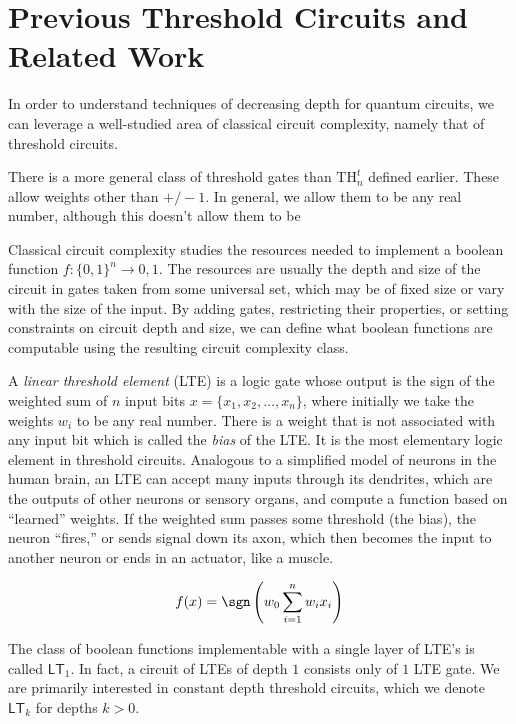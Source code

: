 \section{Previous Threshold Circuits and Related Work}

In order to understand techniques of decreasing depth for quantum 
circuits, we can leverage a well-studied area of classical circuit
complexity, namely that of threshold circuits.

There is a more general class of threshold gates than $\text{TH}_n^t$
defined earlier. These allow weights other than $+/-1$. In general, we
allow them to be any real number, although this doesn't allow them to
be 

Classical circuit complexity studies the resources needed
to implement a boolean function
$f:\{0,1\}^n \rightarrow {0,1}$. The resources are usually the
depth and size of the circuit in gates taken from some universal
set, which may be of fixed size or vary with the size of the input.
By adding gates, restricting their properties, or setting
constraints on circuit depth and size, we can define what boolean
functions are computable using the resulting circuit complexity
class.

A \emph{linear threshold element} (LTE) is a logic gate whose output is the
sign of the weighted sum of $n$ input bits $x = \{x_1, x_2, \ldots, x_n\}$,
where initially we take
the weights $w_i$ to be any real number. There is a weight that is not
associated with any input bit which is called the \emph{bias} of the
LTE. It is the most elementary logic element in threshold circuits.
Analogous to a simplified model of neurons in the human brain, an LTE can
accept many inputs through its dendrites, which are the outputs of other
neurons or sensory organs, and compute a function based on ``learned'' 
weights. If the weighted sum passes some threshold (the bias), the neuron
``fires,'' or sends signal down its axon, which then becomes the input to
another neuron or ends in an actuator, like a muscle.

\begin{equation}
f(x) = \sgn\left( w_0 \sum_{i=1}^n w_i x_i \right)
\end{equation}

The class of boolean functions implementable with a single layer
of LTE's is called
$\textsf{LT}_1$. In fact, a circuit of LTEs of depth $1$ consists only
of $1$ LTE gate. We are primarily interested in constant depth threshold
circuits, which we denote $\textsf{LT}_k$ for depths $k>0$.

